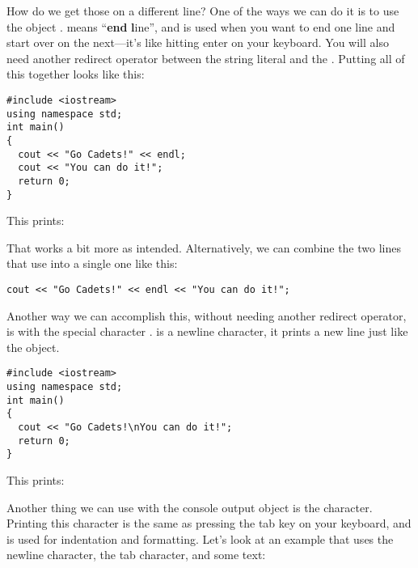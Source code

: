 How do we get those on a different line? 
One of the ways we can do it is to use the object . 
 means ``\textbf{end} \textbf{l}ine'', and is used when you want to end one line and start over on the next---it's like hitting enter on your keyboard. 
You will also need another redirect operator between the string literal and the . 
Putting all of this together looks like this:

\noindent\begin{minipage}{\linewidth}\begin{lstlisting}
#include <iostream>
using namespace std;
int main()
{
  cout << "Go Cadets!" << endl;
  cout << "You can do it!";
  return 0;
}
\end{lstlisting}\end{minipage}

\noindent This prints:

\noindent {}

\noindent {}

That works a bit more as intended. 
Alternatively, we can combine the two lines that use  into a single one like this:

\noindent\begin{minipage}{\linewidth}\begin{lstlisting}
cout << "Go Cadets!" << endl << "You can do it!";
\end{lstlisting}\end{minipage}

Another way we can accomplish this, without needing another redirect operator, is with the special character .
 is a newline character, it prints a new line just like the  object. 

\noindent\begin{minipage}{\linewidth}\begin{lstlisting}
#include <iostream>
using namespace std;
int main()
{
  cout << "Go Cadets!\nYou can do it!";
  return 0;
}
\end{lstlisting}\end{minipage}

\noindent This prints:

\noindent {}

\noindent {}

Another thing we can use with the console output object is the  character. 
Printing this character is the same as pressing the tab key on your keyboard, and is used for indentation and formatting. 
Let's look at an example that uses the newline character, the tab character, and some text:

